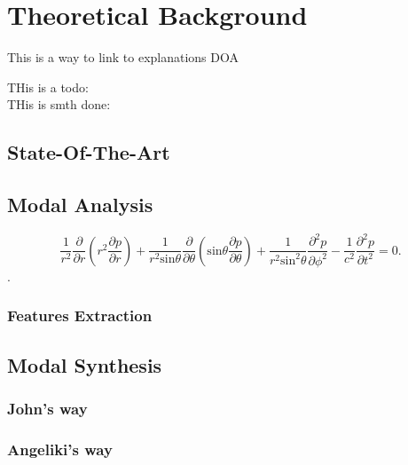 \chapter{Theoretical Background}\label{ch:theory}
\mbox{}\par
This is a way to link to explanations \gls{DOA} 

THis is a todo: \\
THis is smth done:\\
\done{}

\section{State-Of-The-Art}\label{sec:state_art}

\section{Modal Analysis}\label{sec:modal_analysis}
\mbox{}\par

\begin{equation}\label{eq:spherical_wave}
 \frac{1}{r^2}\frac{\partial}{\partial r}(r^2 \frac{\partial p}{\partial r})+\frac{1}{r^2 \text{sin}\theta}\frac{\partial}{\partial \theta}(\text{sin}\theta\frac{\partial p}{\partial \theta}) + \frac{1}{r^2 \text{sin}^2\theta}\frac{\partial^2 p}{\partial \phi^2}-\frac{1}{c^2}\frac{\partial^2 p}{\partial t^2} = 0.
\end{equation}
 \cite{bib:fourierAcoustics}.
\subsection{Features Extraction}\label{sec:features_extraction}
\mbox{}\par
 
\section{Modal Synthesis}\label{sec:modal_synthesis}
\mbox{}\par 


\subsection{John's way}
\mbox{}\par
\subsection{Angeliki's way}
\mbox{}\par
